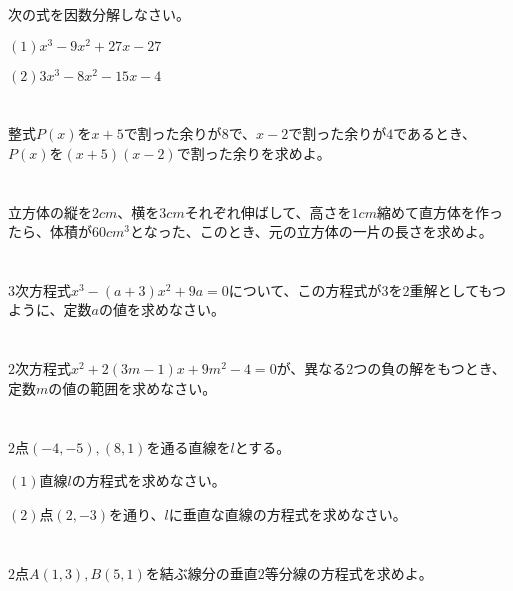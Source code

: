 \documentclass[twocolumn, 20pt]{jarticle}
\begin{document}
\vspace{-0.5cm}
\section{}
次の式を因数分解しなさい。

$(1)x^3 - 9x^2 + 27x - 27$

$(2)3x^3-8x^2 -15x -4$
\vspace{-0.5cm}
\section{}
整式$P(x)$を$x+5$で割った余りが$8$で、$x-2$で割った余りが$4$であるとき、$P(x)$を$(x+5)(x-2)$で割った余りを求めよ。
\vspace{-0.5cm}
\section{}

立方体の縦を$2cm$、横を$3cm$それぞれ伸ばして、高さを$1cm$縮めて直方体を作ったら、体積が$60cm^3$となった、このとき、元の立方体の一片の長さを求めよ。
\vspace{-0.5cm}
\section{}

$3$次方程式$x^3 - (a + 3)x^2+9a=0$について、この方程式が$3$を$2$重解としてもつように、定数$a$の値を求めなさい。

\vspace{-0.5cm}
\section{}
$2$次方程式$x^2 + 2(3m - 1)x + 9m^2 -4 =0 $が、異なる$2$つの負の解をもつとき、定数$m$の値の範囲を求めなさい。


\vspace{-0.5cm}
\section{}
$2$点$(-4, -5),(8, 1)$を通る直線を$\displaystyle l$とする。

$(1)$直線$\displaystyle l$の方程式を求めなさい。

$(2)$点$(2, -3)$を通り、$\displaystyle l$に垂直な直線の方程式を求めなさい。
\vspace{-0.5cm}
\section{}
$2$点$A(1, 3),B(5, 1)$を結ぶ線分の垂直$2$等分線の方程式を求めよ。
\end{document}
